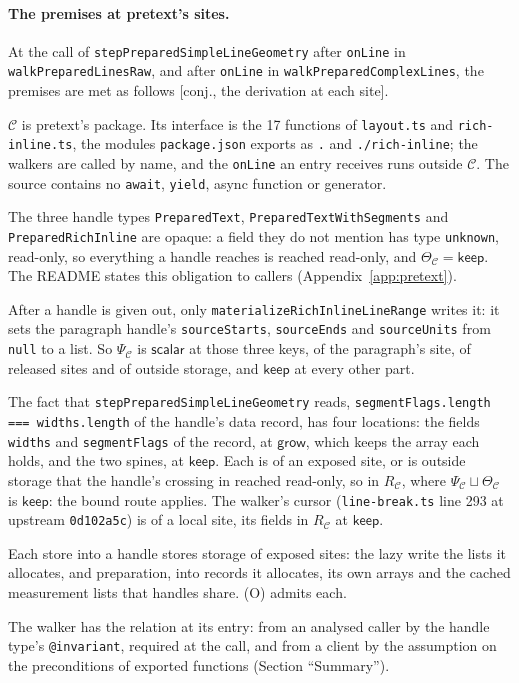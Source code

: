 \documentclass[10pt,a4paper]{article}
\theoremstyle{definition}
\theoremstyle{remark}
\newcommand{\kw}[1]{\mathsf{#1}}
\newcommand{\keep}{\kw{keep}}
\newcommand{\grow}{\kw{grow}}
\newcommand{\code}[1]{\texttt{#1}}
\newcommand{\status}[1]{\textsf{\small[#1]}}
\newcommand{\entry}[1]{\paragraph{#1.}}
\begin{document}
\entry{The premises at pretext's sites} At the call of
\code{stepPreparedSimpleLineGeometry} after \code{onLine} in
\code{walkPreparedLinesRaw}, and after \code{onLine} in
\code{walkPreparedComplexLines}, the premises are met as follows
\status{conj., the derivation at each site}.
\begin{description}[leftmargin=1.5em,style=nextline]
\item[The component] $\mathcal{C}$ is pretext's package. Its interface is
the 17 functions of \code{layout.ts} and \code{rich-inline.ts}, the
modules \code{package.json} exports as \code{.} and
\code{./rich-inline}; the walkers are called by name, and the
\code{onLine} an entry receives runs outside $\mathcal{C}$. The source
contains no \code{await}, \code{yield}, async function or generator.
\item[The client obligation] The three handle types \code{PreparedText},
\code{PreparedTextWithSegments} and \code{PreparedRichInline} are opaque:
a field they do not mention has type \code{unknown}, read-only, so
everything a handle reaches is reached read-only, and
$\Theta_{\mathcal{C}}=\keep$. The README states this obligation to callers
(Appendix~\ref{app:pretext}).
\item[The protocol] After a handle is given out, only
\code{materializeRichInlineLineRange} writes it: it sets the paragraph
handle's \code{sourceStarts}, \code{sourceEnds} and \code{sourceUnits}
from \code{null} to a list. So $\Psi_{\mathcal{C}}$ is $\kw{scalar}$ at those
three keys, of the paragraph's site, of released sites and of outside
storage, and $\keep$ at every other part.
\item[The support] The fact that \code{stepPreparedSimpleLineGeometry}
reads, \code{segmentFlags.length === widths.length} of the handle's data
record, has four locations: the fields \code{widths} and
\code{segmentFlags} of the record, at $\grow$, which keeps the array each
holds, and the two spines, at $\keep$. Each is of an exposed site, or is
outside storage that the handle's crossing in reached read-only, so in
$R_{\mathcal{C}}$, where $\Psi_{\mathcal{C}}\sqcup\Theta_{\mathcal{C}}$ is $\keep$:
the bound route applies. The
walker's cursor (\code{line-break.ts} line 293 at upstream
\code{0d102a5c}) is of a local site, its fields in $R_{\mathcal{C}}$ at
$\keep$.
\item[Ownership] Each store into a handle stores storage of exposed
sites: the lazy write the lists it allocates, and preparation, into
records it allocates, its own arrays and the cached measurement lists
that handles share. (O) admits each.
\item[The fact at entry] The walker has the relation at its entry: from
an analysed caller by the handle type's \code{@invariant}, required at
the call, and from a client by the assumption on the preconditions of
exported functions (Section ``Summary'').
\end{description}
\end{document}
